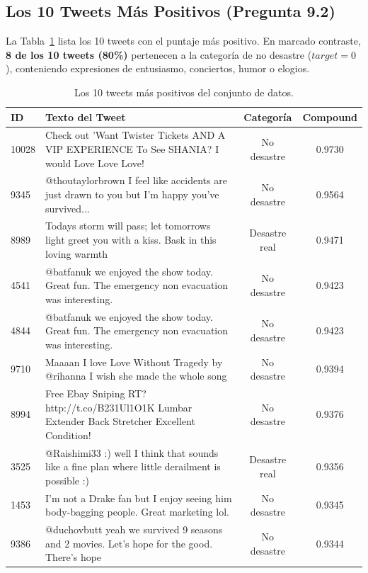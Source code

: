 \documentclass[11pt,a4paper]{article}
\begin{document}
\subsection{Los 10 Tweets Más Positivos (Pregunta 9.2)}
La Tabla~\ref{tab:top10_pos} lista los 10 tweets con el puntaje más positivo. En marcado contraste, \textbf{8 de los 10 tweets (80\%)} pertenecen a la categoría de no desastre ($target = 0$), conteniendo expresiones de entusiasmo, conciertos, humor o elogios.

\begin{table}[H]
\centering
\scriptsize
\caption{Los 10 tweets más positivos del conjunto de datos.}
\label{tab:top10_pos}
\begin{tabularx}{\textwidth}{lp{9.8cm}cc}
\toprule
\textbf{ID} & \textbf{Texto del Tweet} & \textbf{Categoría} & \textbf{Compound} \\
\midrule
10028 & Check out 'Want Twister Tickets AND A VIP EXPERIENCE To See SHANIA? I would Love Love Love! & No desastre & 0.9730 \\
9345 & @thoutaylorbrown I feel like accidents are just drawn to you but I'm happy you've survived... & No desastre & 0.9564 \\
8989 & Todays storm will pass; let tomorrows light greet you with a kiss. Bask in this loving warmth & Desastre real & 0.9471 \\
4541 & @batfanuk we enjoyed the show today. Great fun. The emergency non evacuation was interesting. & No desastre & 0.9423 \\
4844 & @batfanuk we enjoyed the show today. Great fun. The emergency non evacuation was interesting. & No desastre & 0.9423 \\
9710 & Maaaan I love Love Without Tragedy by @rihanna I wish she made the whole song & No desastre & 0.9394 \\
8994 & Free Ebay Sniping RT? http://t.co/B231Ul1O1K Lumbar Extender Back Stretcher Excellent Condition! & No desastre & 0.9376 \\
3525 & @Raishimi33 :) well I think that sounds like a fine plan where little derailment is possible :) & Desastre real & 0.9356 \\
1453 & I'm not a Drake fan but I enjoy seeing him body-bagging people. Great marketing lol. & No desastre & 0.9345 \\
9386 & @duchovbutt yeah we survived 9 seasons and 2 movies. Let's hope for the good. There's hope & No desastre & 0.9344 \\
\bottomrule
\end{tabularx}
\end{table}
\end{document}
